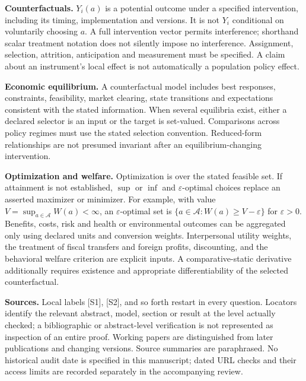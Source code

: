 \documentclass[11pt,a4paper]{article}
\begin{document}
\textbf{Counterfactuals.} $Y_i(a)$ is a potential outcome under a specified intervention, including its timing, implementation and versions. It is not $Y_i$ conditional on voluntarily choosing $a$. A full intervention vector permits interference; shorthand scalar treatment notation does not silently impose no interference. Assignment, selection, attrition, anticipation and measurement must be specified. A claim about an instrument's local effect is not automatically a population policy effect.

\textbf{Economic equilibrium.} A counterfactual model includes best responses, constraints, feasibility, market clearing, state transitions and expectations consistent with the stated information. When several equilibria exist, either a declared selector is an input or the target is set-valued. Comparisons across policy regimes must use the stated selection convention. Reduced-form relationships are not presumed invariant after an equilibrium-changing intervention.

\textbf{Optimization and welfare.} Optimization is over the stated feasible set. If attainment is not established, $\sup$ or $\inf$ and $\varepsilon$-optimal choices replace an asserted maximizer or minimizer. For example, with value $V=\sup_{a\in\mathcal A}W(a)<\infty$, an $\varepsilon$-optimal set is $\{a\in\mathcal A:W(a)\geq V-\varepsilon\}$ for $\varepsilon>0$. Benefits, costs, risk and health or environmental outcomes can be aggregated only using declared units and conversion weights. Interpersonal utility weights, the treatment of fiscal transfers and foreign profits, discounting, and the behavioral welfare criterion are explicit inputs. A comparative-static derivative additionally requires existence and appropriate differentiability of the selected counterfactual.

\textbf{Sources.} Local labels [S1], [S2], and so forth restart in every question. Locators identify the relevant abstract, model, section or result at the level actually checked; a bibliographic or abstract-level verification is not represented as inspection of an entire proof. Working papers are distinguished from later publications and changing versions. Source summaries are paraphrased. No historical audit date is specified in this manuscript; dated URL checks and their access limits are recorded separately in the accompanying review.
\end{document}

